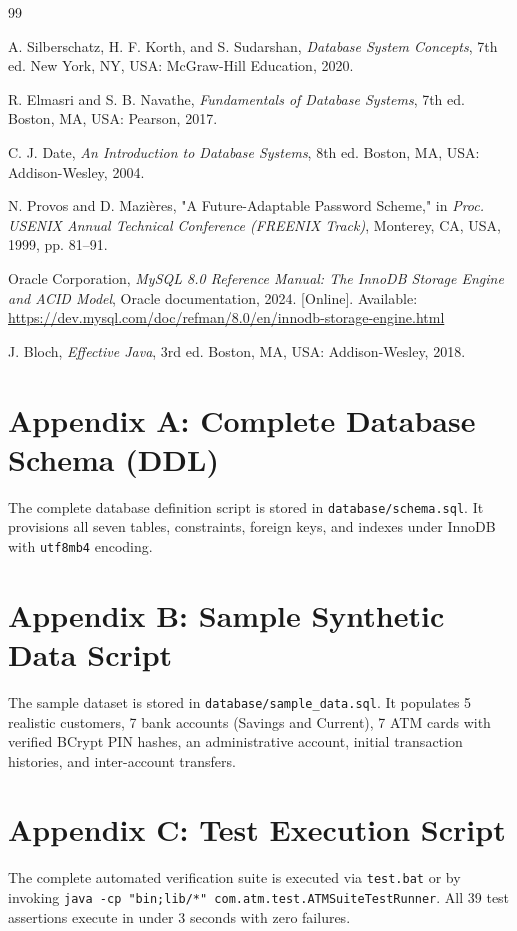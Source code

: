 \documentclass[11pt,a4paper]{report}
\begin{document}
\begin{thebibliography}{99}

A. Silberschatz, H. F. Korth, and S. Sudarshan, 
\textit{Database System Concepts}, 7th ed. New York, NY, USA: McGraw-Hill Education, 2020.

R. Elmasri and S. B. Navathe, 
\textit{Fundamentals of Database Systems}, 7th ed. Boston, MA, USA: Pearson, 2017.

C. J. Date, 
\textit{An Introduction to Database Systems}, 8th ed. Boston, MA, USA: Addison-Wesley, 2004.

N. Provos and D. Mazières, 
"A Future-Adaptable Password Scheme," 
in \textit{Proc. USENIX Annual Technical Conference (FREENIX Track)}, Monterey, CA, USA, 1999, pp. 81--91.

Oracle Corporation, 
\textit{MySQL 8.0 Reference Manual: The InnoDB Storage Engine and ACID Model}, Oracle documentation, 2024. [Online]. Available: \url{https://dev.mysql.com/doc/refman/8.0/en/innodb-storage-engine.html}

J. Bloch, 
\textit{Effective Java}, 3rd ed. Boston, MA, USA: Addison-Wesley, 2018.

\end{thebibliography}

\newpage
\appendix
\section*{Appendix A: Complete Database Schema (DDL)}
The complete database definition script is stored in \texttt{database/schema.sql}. It provisions all seven tables, constraints, foreign keys, and indexes under InnoDB with \texttt{utf8mb4} encoding.

\section*{Appendix B: Sample Synthetic Data Script}
The sample dataset is stored in \texttt{database/sample_data.sql}. It populates 5 realistic customers, 7 bank accounts (Savings and Current), 7 ATM cards with verified BCrypt PIN hashes, an administrative account, initial transaction histories, and inter-account transfers.

\section*{Appendix C: Test Execution Script}
The complete automated verification suite is executed via \texttt{test.bat} or by invoking \texttt{java -cp "bin;lib/*" com.atm.test.ATMSuiteTestRunner}. All 39 test assertions execute in under 3 seconds with zero failures.
\end{document}
